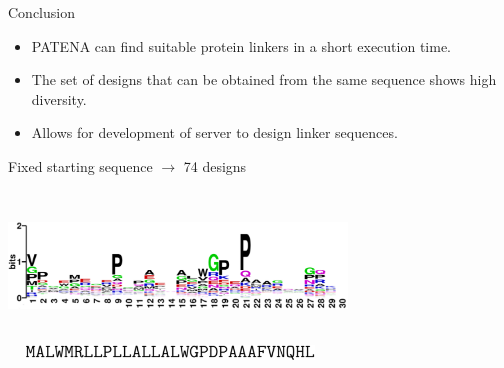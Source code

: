 \documentclass{beamer}
\begin{document}
\begin{frame}{Conclusion}
\begin{itemize}
 \item PATENA can find suitable protein linkers in a short execution time.
 \item The set of designs that can be obtained from the same sequence shows high diversity. 
 \item Allows for development of server to design linker sequences.
\end{itemize}
\end{frame}

























\begin{frame}
\centering
Fixed starting sequence $\rightarrow$ 74 designs\\
\begin{adjustwidth}{-1.5em}{-2.5em}
\includegraphics[width=340px,height=150px]{../img/logo.png}\\ 
\vspace{10px}
\hspace{18px}\includegraphics[width=325px,height=15px]{../img/sequence.png}
\end{adjustwidth}
\end{frame}
\end{document}
